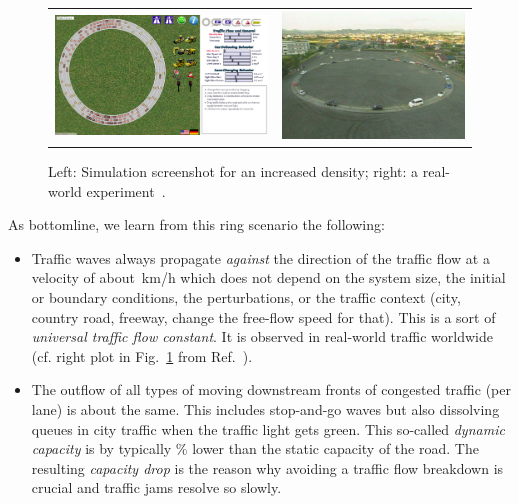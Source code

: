 \documentclass[paper=A4,pagesize=auto,11pt]{scrartcl}
\begin{document}
\begin{figure}[!th]
\centering
\begin{tabular}{cc}
  \includegraphics[width=70mm]{figs/screen_ringroad.png} &
  \includegraphics[width=60mm]{figs/nj265378fig2.jpg} 
\end{tabular}

 \caption{\label{fig:ringroadScenario}Left: Simulation screenshot for
   an increased density; right: a real-world experiment~\cite{Sugiyama-NJP08}.}

\end{figure}

As bottomline, we learn from this ring scenario the following:
 \begin{itemize}
\item Traffic waves always propagate \textit{against} the direction of
  the traffic flow at a velocity of about~\unit[15]{km/h} which does
  not depend on the system size, the initial or boundary conditions, the
  perturbations, or the traffic context (city, country road, freeway,
  change the free-flow speed for that). 
This is a sort of \textit{universal traffic
    flow constant}.  It is observed in real-world traffic worldwide (cf. right plot in Fig.~\ref{fig:ringroadScenario} from Ref.~\cite{Sugiyama-NJP08}).
\item 
The outflow of all types of moving
downstream fronts of congested traffic (per lane) is about the
same. This includes stop-and-go waves but also dissolving queues in
city traffic when the traffic light gets green. This so-called
\textit{dynamic capacity} is by typically \unit[10-20]{\%} lower than
the static capacity of the road. The resulting \textit{capacity drop}
is the reason why avoiding a traffic flow breakdown is crucial and
traffic jams resolve so slowly. 
\end{itemize}
\end{document}
